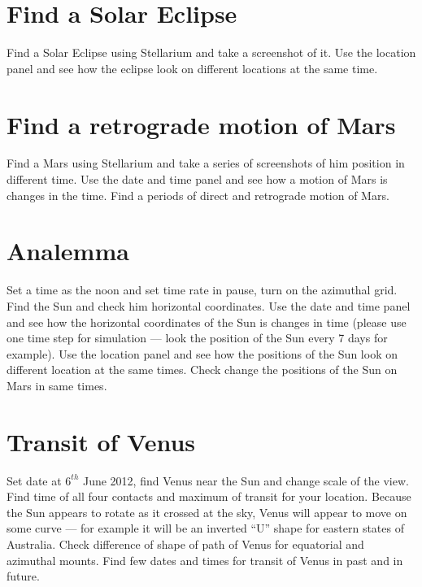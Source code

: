 \section{Find a Solar Eclipse}
\label{sec:Exercises:SolarEclipse}

Find a Solar Eclipse using Stellarium and take a screenshot of it. Use
the location panel and see how the eclipse look on different locations
at the same time.

\section{Find a retrograde motion of Mars}
\label{sec:Exercises:RetrogradeMotionOfMars}

Find a Mars using Stellarium and take a series of screenshots of him 
position in different time. Use the date and time panel and see how 
a motion of Mars is changes  in the time. Find a periods of direct 
and retrograde motion of Mars.

\section{Analemma}
\label{sec:Exercises:Analemma}

Set a time as the noon and set time rate in pause, turn on the 
azimuthal grid. Find the Sun and check him horizontal coordinates. 
Use the date and time panel and see how the horizontal coordinates 
of the Sun is changes in time (please use one time step for 
simulation --- look the position of the Sun every 7 days for 
example). Use the location panel and see how the positions of the 
Sun look on different location at the same times. Check change 
the positions of the Sun on Mars in same times.

\section{Transit of Venus}
\label{sec:Exercises:TransitOfVenus}

Set date at $6^{th}$ June 2012, find Venus near the Sun and change 
scale of the view. Find time of all four contacts and maximum of 
transit for your location. Because the Sun appears to rotate as 
it crossed at the sky, Venus will appear to move on some curve --- 
for example it will be an inverted ``U'' shape for eastern states 
of Australia. Check difference of shape of path of Venus for 
equatorial and azimuthal mounts. Find few dates and times for 
transit of Venus in past and in future.

